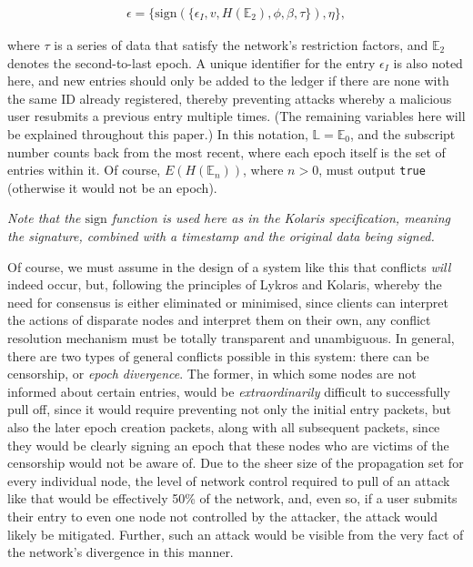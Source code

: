 \documentclass{extreport}
\begin{document}
\begin{align*}
\epsilon = \{ \mathrm{sign}( \{ \epsilon_I, v, H(\mathbb{E}_2), \phi, \beta, \tau \} ), \eta \}, \tag{3.3}
\end{align*}

where \(\tau\) is a series of data that satisfy the network's restriction factors, and \(\mathbb{E}_2\) denotes the second-to-last epoch. A unique identifier for the entry \(\epsilon_I\) is also noted here, and new entries should only be added to the ledger if there are none with the same ID already registered, thereby preventing attacks whereby a malicious user resubmits a previous entry multiple times. (The remaining variables here will be explained throughout this paper.) In this notation, \(\mathbb{L} = \mathbb{E}_0\), and the subscript number counts back from the most recent, where each epoch itself is the set of entries within it. Of course, \(E(H(\mathbb{E}_n))\), where \(n > 0\), must output \texttt{true} (otherwise it would not be an epoch).

\emph{Note that the \(\mathrm{sign}\) function is used here as in the Kolaris specification, meaning the signature, combined with a timestamp and the original data being signed.}

Of course, we must assume in the design of a system like this that conflicts \emph{will} indeed occur, but, following the principles of Lykros and Kolaris, whereby the need for consensus is either eliminated or minimised, since clients can interpret the actions of disparate nodes and interpret them on their own, any conflict resolution mechanism must be totally transparent and unambiguous. In general, there are two types of general conflicts possible in this system: there can be censorship, or \emph{epoch divergence}. The former, in which some nodes are not informed about certain entries, would be \emph{extraordinarily} difficult to successfully pull off, since it would require preventing not only the initial entry packets, but also the later epoch creation packets, along with all subsequent packets, since they would be clearly signing an epoch that these nodes who are victims of the censorship would not be aware of. Due to the sheer size of the propagation set for every individual node, the level of network control required to pull of an attack like that would be effectively 50\% of the network, and, even so, if a user submits their entry to even one node not controlled by the attacker, the attack would likely be mitigated. Further, such an attack would be visible from the very fact of the network's divergence in this manner.
\end{document}
